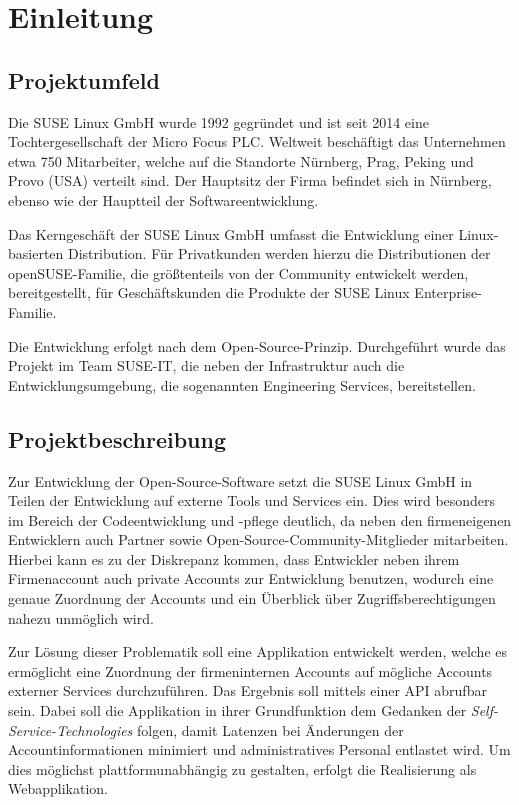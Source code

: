 \section{Einleitung}
\label{sec:Einleitung}

\subsection{Projektumfeld}
\label{sec:Projektumfeld}
Die SUSE Linux GmbH wurde 1992 gegründet und ist seit 2014 eine Tochtergesellschaft der Micro Focus
PLC. Weltweit beschäftigt das Unternehmen etwa 750 Mitarbeiter, welche auf die Standorte Nürnberg,
Prag, Peking und Provo (USA) verteilt sind. Der Hauptsitz der Firma befindet sich in Nürnberg,
ebenso wie der Hauptteil der Softwareentwicklung.

Das Kerngeschäft der SUSE Linux GmbH umfasst die Entwicklung einer Linux-basierten Distribution.
Für Privatkunden werden hierzu die Distributionen der openSUSE-Familie, die größtenteils von der
Community entwickelt werden, bereitgestellt, für Geschäftskunden die Produkte der SUSE Linux
Enterprise-Familie.

Die Entwicklung erfolgt nach dem Open-Source-Prinzip.
Durchgeführt wurde das Projekt im Team SUSE-IT, die neben der Infrastruktur auch die
Entwicklungsumgebung, die sogenannten Engineering Services, bereitstellen.

\subsection{Projektbeschreibung}
\label{sec:Projektbeschreibung}
Zur Entwicklung der Open-Source-Software setzt die SUSE Linux GmbH in Teilen der Entwicklung
auf externe Tools und Services ein. Dies wird besonders im Bereich der Codeentwicklung und -pflege
deutlich, da neben den firmeneigenen Entwicklern auch Partner sowie Open-Source-Community-Mitglieder
mitarbeiten. Hierbei kann es zu der Diskrepanz kommen, dass Entwickler neben ihrem Firmenaccount
auch private Accounts zur Entwicklung benutzen, wodurch eine genaue Zuordnung der Accounts und
ein Überblick über Zugriffsberechtigungen nahezu unmöglich wird.

Zur Lösung dieser Problematik soll eine Applikation entwickelt werden, welche es ermöglicht
eine Zuordnung der firmeninternen Accounts auf mögliche Accounts externer Services durchzuführen.
Das Ergebnis soll mittels einer \acs{API} abrufbar sein.
Dabei soll die Applikation in ihrer Grundfunktion dem Gedanken der \textit{Self-Service-Technologies} folgen,
damit Latenzen bei Änderungen der Accountinformationen minimiert und administratives Personal
entlastet wird. Um dies möglichst plattformunabhängig zu gestalten, erfolgt die Realisierung als
Webapplikation.

